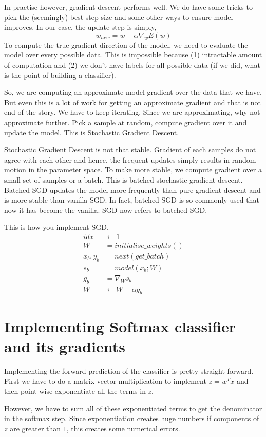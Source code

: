 \documentclass[12pt,crop=false,class=article,convert={density=300,outext=.compiled.png}]{standalone}
\begin{document}
In practise however, gradient descent performs well. We do have some
tricks to pick the (seemingly) best step size and some other ways to
ensure model improves. In our case, the update step is simply,
%
$$w_{new} = w - \alpha \nabla_{w}E(w)$$
%
To compute the true gradient direction of the model, we need to evaluate
the model over every possible data. This is impossible because (1)
intractable amount of computation and (2) we don't have labels for all
possible data (if we did, what is the point of building a classifier).

So, we are computing an approximate model gradient over the data that we
have. But even this is a lot of work for getting an approximate gradient
and that is not end of the story. We have to keep iterating. Since we
are approximating, why not approximate further. Pick a sample at random,
compute gradient over it and update the model. This is Stochastic
Gradient Descent.

Stochastic Gradient Descent is not that stable. Gradient of each samples do not agree with each other
and hence, the frequent updates simply results in random motion in the
parameter space. To make more stable, we compute gradient over a small
set of samples or a batch. This is batched stochastic gradient descent.
Batched SGD updates the model more frequently than pure gradient descent
and is more stable than vanilla SGD. In fact, batched SGD is so commonly
used that now it has become the vanilla. SGD now refers to batched SGD.

This is how you implement SGD.
%
\begin{align*}
idx &\gets 1
\\W &= initialise\_weights()
\\x_b,y_b &= next(get\_batch)
\\s_b  &= model(x_b;W)
\\g_b  &= \nabla_W s_b
\\W  &\gets W - \alpha g_b 
\end{align*}
%
\section*{Implementing Softmax classifier and its gradients}
Implementing the forward prediction of the classifier is pretty straight
forward. First we have to do a matrix vector multiplication to implement
$z=w^Tx$ and then point-wise exponentiate all the terms in $z$.

However, we have to sum all of these exponentiated terms to get the
denominator in the softmax step. Since exponentiation creates huge
numbers if components of $z$ are greater than $1$, this creates some
numerical errors.
\end{document}
